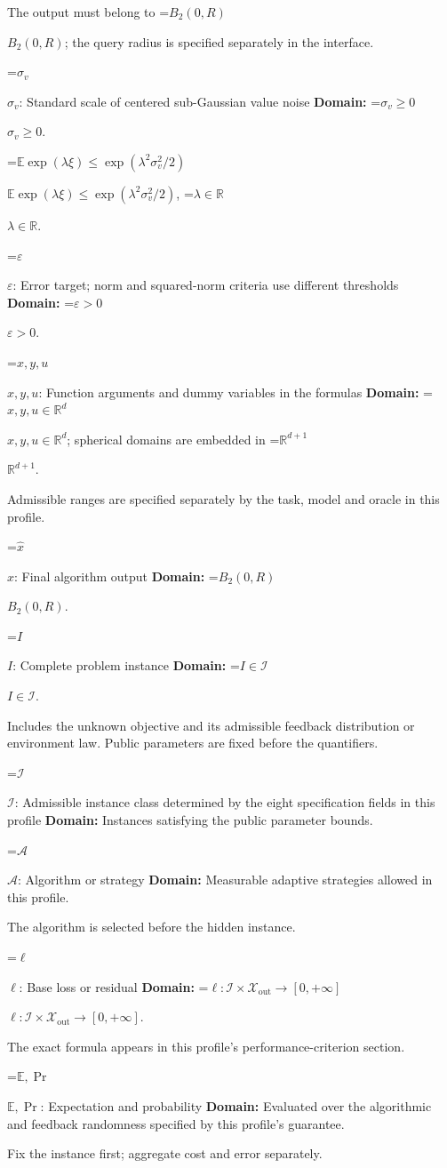 \documentclass[10pt,a4paper]{article}
\newcommand{\AtlasMath}[1]{\par\begingroup\centering\setbox0=\hbox{$\displaystyle #1$}\ifdim\wd0>1.4\linewidth\typeout{ATLAS WIDE FORMULA: \the\wd0}\fi\ifdim\wd0>\linewidth\resizebox{\linewidth}{!}{\box0}\else\box0\fi\par\endgroup}
\newcommand{\AtlasInlineMath}[1]{\begingroup\setbox0=\hbox{$#1$}\ifdim\wd0>.4\linewidth\endgroup\AtlasMath{#1}\else\endgroup$#1$\fi}
\begin{document}
The output must belong to \AtlasInlineMath{B_2(0,R)}; the query radius is specified separately in the interface.

\AtlasInlineMath{\sigma_v}: Standard scale of centered sub-Gaussian value noise \textbf{Domain:} \AtlasInlineMath{\sigma_v\ge0}.

\AtlasInlineMath{\mathbb{E}\exp(\lambda\xi)\le\exp(\lambda^2\sigma_v^2/2)}, \AtlasInlineMath{\lambda\in\mathbb{R}}.

\AtlasInlineMath{\varepsilon}: Error target; norm and squared-norm criteria use different thresholds \textbf{Domain:} \AtlasInlineMath{\varepsilon>0}.

\AtlasInlineMath{x,y,u}: Function arguments and dummy variables in the formulas \textbf{Domain:} \AtlasInlineMath{x,y,u\in\mathbb{R}^d}; spherical domains are embedded in \AtlasInlineMath{\mathbb{R}^{d+1}}.

Admissible ranges are specified separately by the task, model and oracle in this profile.

\AtlasInlineMath{\widehat{x}}: Final algorithm output \textbf{Domain:} \AtlasInlineMath{B_2(0,R)}.

\AtlasInlineMath{I}: Complete problem instance \textbf{Domain:} \AtlasInlineMath{I\in\mathcal{I}}.

Includes the unknown objective and its admissible feedback distribution or environment law. Public parameters are fixed before the quantifiers.

\AtlasInlineMath{\mathcal{I}}: Admissible instance class determined by the eight specification fields in this profile \textbf{Domain:} Instances satisfying the public parameter bounds.

\AtlasInlineMath{\mathcal{A}}: Algorithm or strategy \textbf{Domain:} Measurable adaptive strategies allowed in this profile.

The algorithm is selected before the hidden instance.

\AtlasInlineMath{\ell}: Base loss or residual \textbf{Domain:} \AtlasInlineMath{\ell:\mathcal{I}\times\mathcal{X}_{\mathrm{out}}\to[0,+\infty]}.

The exact formula appears in this profile's performance-criterion section.

\AtlasInlineMath{\mathbb{E},\Pr}: Expectation and probability \textbf{Domain:} Evaluated over the algorithmic and feedback randomness specified by this profile's guarantee.

Fix the instance first; aggregate cost and error separately.
\end{document}
